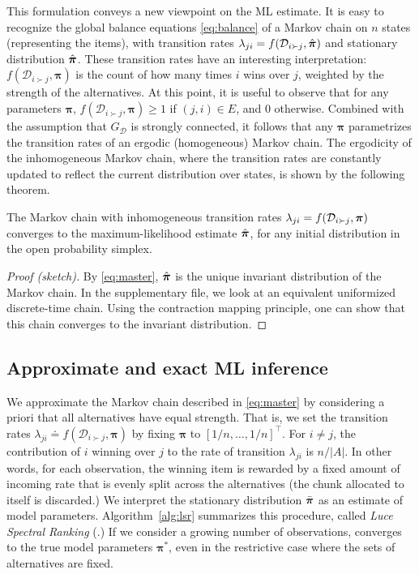 This formulation conveys a new viewpoint on the ML estimate.
It is easy to recognize the global balance equations \eqref{eq:balance} of a Markov chain on $n$ states (representing the items), with transition rates $\lambda_{ji} = f(\mathcal{D}_{i \succ j}, \hat{\bm{\pi}})$ and stationary distribution $\hat{\bm{\pi}}$.
These transition rates have an interesting interpretation: $f(\mathcal{D}_{i \succ j}, \bm{\pi})$ is the count of how many times $i$ wins over $j$, weighted by the strength of the alternatives.
At this point, it is useful to observe that for any parameters $\bm{\pi}$, $f(\mathcal{D}_{i \succ j}, \bm{\pi}) \ge 1$ if $(j,i) \in E$, and $0$ otherwise.
Combined with the assumption that $G_\mathcal{D}$ is strongly connected, it follows that any $\bm{\pi}$ parametrizes the transition rates of an ergodic (homogeneous) Markov chain.
The ergodicity of the inhomogeneous Markov chain, where the transition rates are constantly updated to reflect the current distribution over states, is shown by the following theorem.
\begin{theorem}
\label{thm:convergence}
The Markov chain with inhomogeneous transition rates $\lambda_{ji} = f(\mathcal{D}_{i \succ j}, \bm{\pi})$ converges to the maximum-likelihood estimate $\hat{\bm{\pi}}$, for any initial distribution in the open probability simplex.
\end{theorem}

\vspace{-0.3cm}
\begin{proof}[Proof (sketch)]
By \eqref{eq:master}, $\hat{\bm{\pi}}$ is the unique invariant distribution of the Markov chain.
In the supplementary file, we look at an equivalent uniformized discrete-time chain.
Using the contraction mapping principle, one can show that this chain converges to the invariant distribution.
\end{proof}


\subsection{Approximate and exact ML inference}

We approximate the Markov chain described in \eqref{eq:master} by considering a priori that all alternatives have equal strength.
That is, we set the transition rates $\lambda_{ji} \doteq f(\mathcal{D}_{i \succ j}, \bm{\pi})$ by fixing $\bm{\pi}$ to $[1/n, \ldots, 1/n]^\intercal$.
For $i \ne j$, the contribution of $i$ winning over $j$ to the rate of transition $\lambda_{ji}$ is $n / |A|$.
In other words, for each observation, the winning item is rewarded by a fixed amount of incoming rate that is evenly split across the alternatives (the chunk allocated to itself is discarded.)
We interpret the stationary distribution $\bar{\bm{\pi}}$ as an estimate of model parameters.
Algorithm~\ref{alg:lsr} summarizes this procedure, called \emph{Luce Spectral Ranking} (\LSR{}.)
If we consider a growing number of observations, \LSR{} converges to the true model parameters $\bm{\pi}^*$, even in the restrictive case where the sets of alternatives are fixed.

